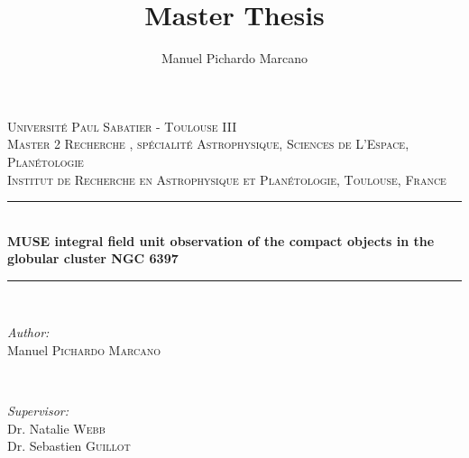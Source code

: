 \documentclass[11pt,a4paper,twoside]{report}
\author{Manuel Pichardo Marcano}
\title{Master Thesis}
\begin{document}
\begin{titlepage}

\newcommand{\HRule}{\rule{\linewidth}{0.5mm}} %

\center %
 

\textsc{\LARGE Universit\'e Paul Sabatier -  Toulouse III}\\[1.5cm] %
\textsc{\large Master 2 Recherche , sp\'ecialit\'e Astrophysique, Sciences de L’Espace, Plan\'etologie}\\[0.5cm] %
\textsc{\large Institut de Recherche en Astrophysique et Planétologie, Toulouse, France}\\[0.5cm] %

\HRule \\[0.4cm]
{ \huge \bfseries MUSE integral field unit observation of the compact objects in the globular cluster NGC 6397}\\[0.4cm] %
\HRule \\[1.5cm]
 

\begin{minipage}{0.4\textwidth}
\begin{flushleft} \large
\emph{Author:}\\
Manuel \textsc{Pichardo Marcano} %
\end{flushleft}
\end{minipage}
~
\begin{minipage}{0.4\textwidth}
\begin{flushright} \large
\emph{Supervisor:} \\
Dr. Natalie \textsc{Webb} \\ %
Dr. Sebastien \textsc{Guillot}  %
\end{flushright}
\end{minipage}\\[4cm]


\end{titlepage}
\end{document}
